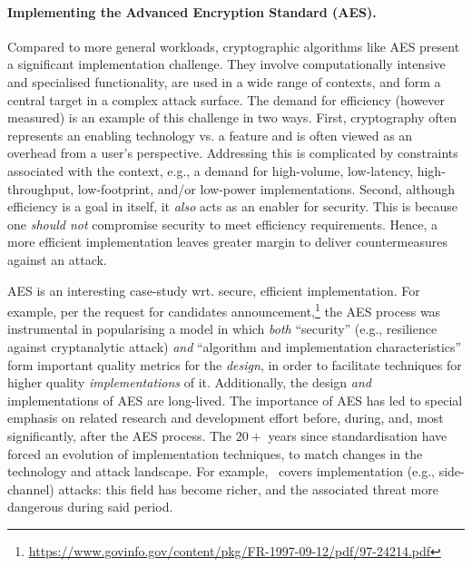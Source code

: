 
\paragraph{Implementing the Advanced Encryption Standard (AES).}

%
%

Compared to more general workloads, cryptographic algorithms like AES
present a significant implementation challenge.
They involve computationally intensive and specialised functionality,
are used in a wide range of contexts,
and
form a central target in a complex attack surface.
The demand for efficiency (however measured) is an example of this
challenge in two ways.
First,
cryptography often represents an enabling technology vs. a feature and
is often viewed as an overhead from a user's perspective.
Addressing this is
complicated by constraints associated with the context, e.g., a demand 
for
high-volume, 
 low-latency, 
high-throughput, 
 low-footprint, 
and/or 
 low-power
 implementations.
Second,
although efficiency is a goal in itself, it {\em also} 
acts as an enabler for security.
This is because one {\em should not}
compromise security to meet efficiency requirements.
Hence, a more efficient implementation leaves greater margin to deliver
countermeasures against an attack.

AES is an interesting case-study wrt. secure, efficient implementation.
For example,
per the request for candidates announcement,\footnote{%
\url{https://www.govinfo.gov/content/pkg/FR-1997-09-12/pdf/97-24214.pdf}
} the AES process was instrumental in popularising a model in which
{\em both}
``security''
(e.g., resilience against cryptanalytic attack)
{\em and}
``algorithm and implementation characteristics''
form important quality metrics for the {\em design}, in order to facilitate
techniques for higher quality {\em implementations} of it.
Additionally,
the design {\em and} implementations of AES are long-lived.
The importance of AES has led to special emphasis on related
research and development effort before, during, and, most significantly, 
after the AES process.
The $20+$ years since standardisation have forced an evolution of 
implementation techniques, to match changes in the technology 
and attack landscape.  For example,~\cite[Section 3.6]{NBBBDFR:01} covers
implementation (e.g., side-channel) attacks: this field has become richer,
and the associated threat more dangerous during said period.


